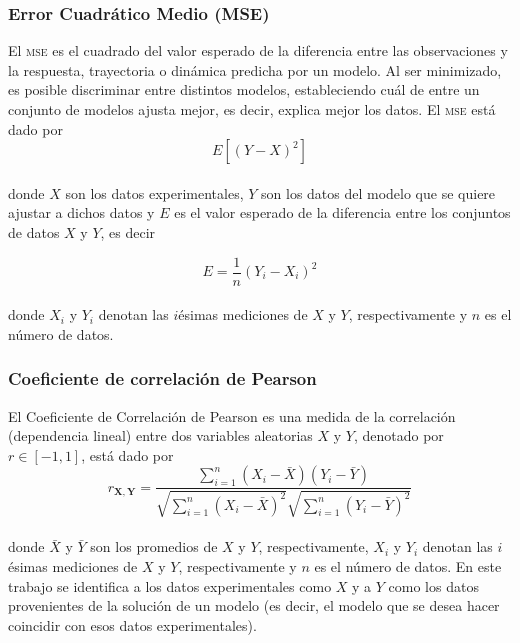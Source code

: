 \subsubsection{Error Cuadrático Medio (MSE)}\label{MSE}

El \textsc{mse} \citep{msewiki} es el cuadrado del valor esperado de la diferencia entre las observaciones y la respuesta, trayectoria o dinámica predicha por un modelo. Al ser minimizado, es posible discriminar entre distintos modelos, estableciendo cuál de entre un conjunto de modelos ajusta mejor, es decir, explica mejor los datos. El \textsc{mse} está dado por 
\begin{equation}
E[(Y - X)^2]
\end{equation}
\\
donde $X$ son los datos experimentales, $Y$ son los datos del modelo que se quiere ajustar a dichos datos y $E$ es el valor esperado de la diferencia entre los conjuntos de datos $X$ y $Y$, es decir

\begin{equation}
	E = \frac{1}{n} (Y_i - X_i)^2
\end{equation}
\\
donde $X_i$ y $Y_i$ denotan las $i$ésimas mediciones de $X$ y $Y$, respectivamente y $n$ es el número de datos.



\subsubsection{Coeficiente de correlación de Pearson}\label{pearson}

El Coeficiente de Correlación de Pearson \citep{pearsoncorrwiki} es una medida de la correlación (dependencia lineal) entre dos variables aleatorias $X$ y $Y$, denotado por $r \in [-1, 1]$, está dado por
\begin{equation}\label{pearsonEQ} 
r_{\mathbf{X},\mathbf{Y}} = \frac{\sum_{i=1}^n (X_i - \bar{X})(Y_i - \bar{Y})} {\sqrt{\sum_{i=1}^n (X_i - \bar{X})^2} \sqrt{\sum_{i=1}^n (Y_i - \bar{Y})^2}}
\end{equation}
\\
donde $\bar{X}$ y $\bar{Y}$ son los promedios de $X$ y $Y$, respectivamente, $X_i$ y $Y_i$ denotan las $i$ésimas mediciones de $X$ y $Y$, respectivamente y $n$ es el número de datos. En este trabajo se identifica a los datos experimentales como $X$ y a $Y$ como los datos provenientes de la solución de un modelo (es decir, el modelo que se desea hacer coincidir con esos datos experimentales).


